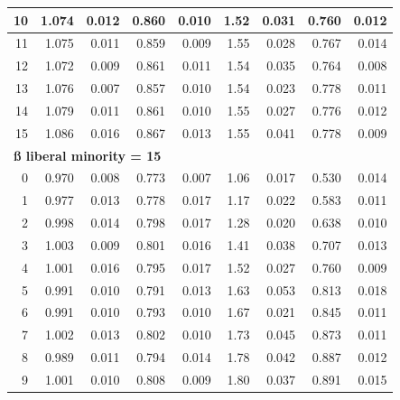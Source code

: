 \documentclass[
]{article}
\begin{document}
\begin{table}
\begin{tabular}[t]{r|r|r|r|r|r|r|r|r}
\hspace{1em}10 & 1.074 & 0.012 & 0.860 & 0.010 & 1.52 & 0.031 & 0.760 & 0.012\\
\hline
\hspace{1em}11 & 1.075 & 0.011 & 0.859 & 0.009 & 1.55 & 0.028 & 0.767 & 0.014\\
\hline
\hspace{1em}12 & 1.072 & 0.009 & 0.861 & 0.011 & 1.54 & 0.035 & 0.764 & 0.008\\
\hline
\hspace{1em}13 & 1.076 & 0.007 & 0.857 & 0.010 & 1.54 & 0.023 & 0.778 & 0.011\\
\hline
\hspace{1em}14 & 1.079 & 0.011 & 0.861 & 0.010 & 1.55 & 0.027 & 0.776 & 0.012\\
\hline
\hspace{1em}15 & 1.086 & 0.016 & 0.867 & 0.013 & 1.55 & 0.041 & 0.778 & 0.009\\
\hline
\multicolumn{9}{l}{\textbf{ß liberal minority = 15}}\\
\hline
\hspace{1em}0 & 0.970 & 0.008 & 0.773 & 0.007 & 1.06 & 0.017 & 0.530 & 0.014\\
\hline
\hspace{1em}1 & 0.977 & 0.013 & 0.778 & 0.017 & 1.17 & 0.022 & 0.583 & 0.011\\
\hline
\hspace{1em}2 & 0.998 & 0.014 & 0.798 & 0.017 & 1.28 & 0.020 & 0.638 & 0.010\\
\hline
\hspace{1em}3 & 1.003 & 0.009 & 0.801 & 0.016 & 1.41 & 0.038 & 0.707 & 0.013\\
\hline
\hspace{1em}4 & 1.001 & 0.016 & 0.795 & 0.017 & 1.52 & 0.027 & 0.760 & 0.009\\
\hline
\hspace{1em}5 & 0.991 & 0.010 & 0.791 & 0.013 & 1.63 & 0.053 & 0.813 & 0.018\\
\hline
\hspace{1em}6 & 0.991 & 0.010 & 0.793 & 0.010 & 1.67 & 0.021 & 0.845 & 0.011\\
\hline
\hspace{1em}7 & 1.002 & 0.013 & 0.802 & 0.010 & 1.73 & 0.045 & 0.873 & 0.011\\
\hline
\hspace{1em}8 & 0.989 & 0.011 & 0.794 & 0.014 & 1.78 & 0.042 & 0.887 & 0.012\\
\hline
\hspace{1em}9 & 1.001 & 0.010 & 0.808 & 0.009 & 1.80 & 0.037 & 0.891 & 0.015\\

\end{tabular}
\end{table}
\end{document}
